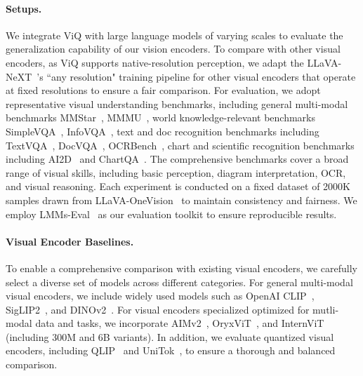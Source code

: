 \documentclass{llmxive}
\begin{document}
\paragraph{Setups.} We integrate ViQ with large language models of varying scales to evaluate the generalization capability of our vision encoders. To compare with other visual encoders, as ViQ supports native-resolution perception, we adapt the LLaVA-NeXT~\cite{liu2024llavanext}'s ``any resolution" training pipeline for other visual encoders that operate at fixed resolutions to ensure a fair comparison. For evaluation, we adopt representative visual understanding benchmarks, including general multi-modal benchmarks MMStar~\cite{chen2024mmstar}, MMMU~\cite{yue2024mmmu}, world knowledge-relevant benchmarks SimpleVQA~\cite{cheng2025simplevqa}, InfoVQA~\cite{mathew2022infographicvqa}, text and doc recognition benchmarks including TextVQA~\cite{singh2019textvqa}, DocVQA~\cite{mathew2021docvqa}, OCRBench~\cite{liu2023ocrbench}, chart and scientific recognition benchmarks including AI2D~\cite{kembhavi2016ai2d} and ChartQA~\cite{masry2022chartqa}. The comprehensive benchmarks cover a broad range of visual skills, including basic perception, diagram interpretation, OCR, and visual reasoning. Each experiment is conducted on a fixed dataset of 2000K samples drawn from LLaVA-OneVision~\cite{li2024llavaov} to maintain consistency and fairness. We employ LMMs-Eval~\cite{li2024lmms} as our evaluation toolkit to ensure reproducible results.

\paragraph{Visual Encoder Baselines.} To enable a comprehensive comparison with existing visual encoders, we carefully select a diverse set of models across different categories. For general multi-modal visual encoders, we include widely used models such as OpenAI CLIP~\cite{radford2021clip}, SigLIP2~\cite{tschannen2025siglip}, and DINOv2~\cite{oquab2023dinov2}. For visual encoders specialized optimized for mutli-modal data and tasks, we incorporate AIMv2~\cite{fini2025multimodal}, OryxViT~\cite{liu2024oryx}, and InternViT~\cite{zhu2025internvl3} (including 300M and 6B variants). In addition, we evaluate quantized visual encoders, including QLIP~\cite{zhao2025qlip} and UniTok~\cite{ma2025unitok}, to ensure a thorough and balanced comparison.
\end{document}
